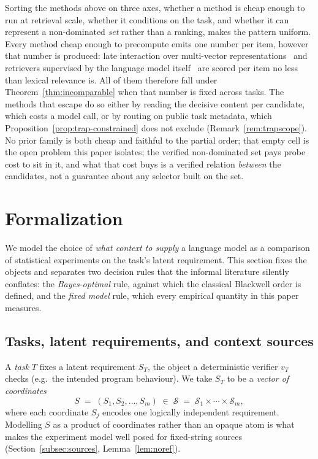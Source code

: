 \documentclass[11pt]{article}
\theoremstyle{plain}
\theoremstyle{definition}
\theoremstyle{remark}
\newcommand{\Scal}{\mathcal{S}}
\begin{document}
Sorting the methods above on three axes, whether a method is cheap enough to run at retrieval
scale, whether it conditions on the task, and whether it can represent a non-dominated \emph{set}
rather than a ranking, makes the pattern uniform. Every method cheap enough to precompute emits
one number per item, however that number is produced: late interaction over multi-vector
representations~\citep{khattab2020colbert} and retrievers supervised by the language model
itself~\citep{guu2020realm,shi2023replug} are scored per item no less than lexical relevance is.
All of them therefore fall under Theorem~\ref{thm:incomparable} when that number is fixed across
tasks. The methods that escape do so either by reading the decisive content per candidate, which
costs a model call, or by routing on public task metadata, which
Proposition~\ref{prop:trap-constrained} does not exclude (Remark~\ref{rem:trapscope}). No prior
family is both cheap and faithful to the partial order; that empty cell is the open problem this
paper isolates; the verified non-dominated set pays probe cost to sit in it, and what that cost
buys is a verified relation \emph{between} the candidates, not a guarantee about any selector
built on the set.
\section{Formalization}
\label{sec:formalization}

We model the choice of \emph{what context to supply} a language model as a comparison of
statistical experiments on the task's latent requirement. This section fixes the objects and
separates two decision rules that the informal literature silently conflates: the
\emph{Bayes-optimal} rule, against which the classical Blackwell order is defined, and the
\emph{fixed model} rule, which every empirical quantity in this paper measures.

\subsection{Tasks, latent requirements, and context sources}

A \emph{task} $T$ fixes a latent requirement $S_T$, the object a deterministic verifier
$v_T$ checks (e.g.\ the intended program behaviour). We take $S_T$ to be a \emph{vector of
coordinates}
\begin{equation}
\label{eq:coordinates}
S \;=\; (S_1, S_2, \dots, S_m) \;\in\; \Scal \;=\; \Scal_1 \times \cdots \times \Scal_m,
\end{equation}
where each coordinate $S_j$ encodes one logically independent requirement. Modelling $S$ as a
product of coordinates rather than an opaque atom is what makes the experiment model well posed
for fixed-string sources (Section~\ref{subsec:sources}, Lemma~\ref{lem:noref}).
\end{document}
